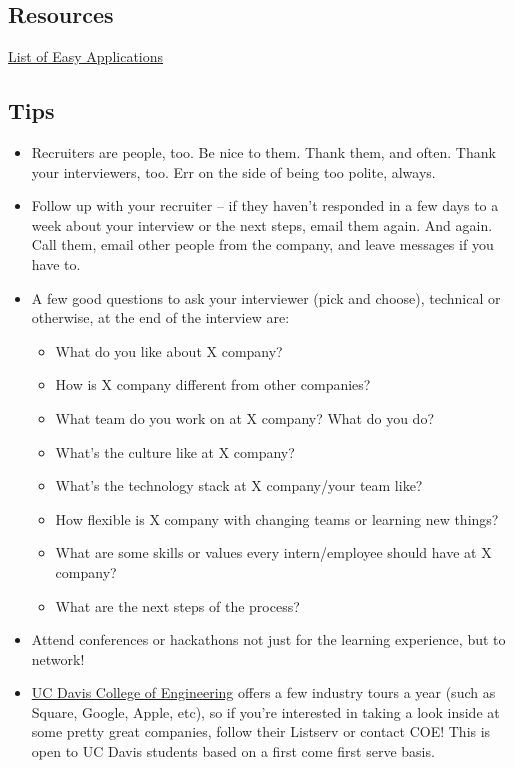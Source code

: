 \documentclass{article}
\begin{document}
\subsection {Resources} 
\href{https://github.com/j-delaney/easy-application}{List of Easy Applications}
\subsection{Tips}
\begin{itemize}
    \item Recruiters are people, too. Be nice to them. Thank them, and often. Thank your interviewers, too. Err on the side of being too polite, always.
    \item Follow up with your recruiter -- if they haven't responded in a few days to a week about your interview or the next steps, email them again. And again. Call them, email other people from the company, and leave messages if you have to. 
    \item A few good questions to ask your interviewer (pick and choose), technical or otherwise, at the end of the interview are:
    \begin{itemize}
        \item What do you like about X company? 
        \item How is X company different from other companies?
        \item What team do you work on at X company? What do you do?  
        \item What's the culture like at X company?
        \item What's the technology stack at X company/your team like?
        \item How flexible is X company with changing teams or learning new things? 
        \item What are some skills or values every intern/employee should have at X company?
        \item What are the next steps of the process?
    \end{itemize}
    \item Attend conferences or hackathons not just for the learning experience, but to network! 
    \item \href{http://engineering.ucdavis.edu/corporate-relations/student-recruitment/company-tours/}{UC Davis College of Engineering} offers a few industry tours a year (such as Square, Google, Apple, etc), so if you're interested in taking a look inside at some pretty great companies, follow their Listserv or contact COE! This is open to UC Davis students based on a first come first serve basis. 
\end{itemize}
\end{document}
